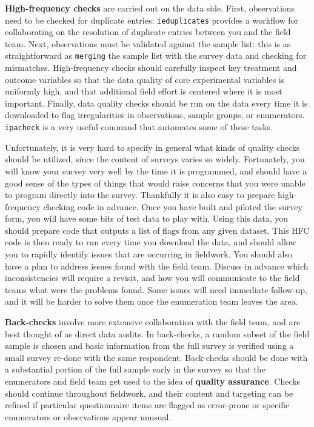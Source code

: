 \textbf{High-frequency checks} are carried out on the data side.
First, observations need to be checked for duplicate entries:
\texttt{ieduplicates}
provides a workflow for collaborating on the resolution of
duplicate entries between you and the field team.
Next, observations must be validated against the sample list:
this is as straightforward as \texttt{merging} the sample list with
the survey data and checking for mismatches.
High-frequency checks should carefully inspect
key treatment and outcome variables
so that the data quality of core experimental variables is uniformly high,
and that additional field effort is centered where it is most important.
Finally, data quality checks
should be run on the data every time it is downloaded
to flag irregularities in observations, sample groups, or enumerators.
\texttt{ipacheck} is a very useful command that automates some of these tasks.

Unfortunately, it is very hard to specify in general
what kinds of quality checks should be utilized,
since the content of surveys varies so widely.
Fortunately, you will know your survey very well
by the time it is programmed, and should have a good sense
of the types of things that would raise concerns
that you were unable to program directly into the survey.
Thankfully it is also easy to prepare high-frequency checking code in advance.
Once you have built and piloted the survey form,
you will have some bits of test data to play with.
Using this data, you should prepare code that outputs
a list of flags from any given dataset.
This HFC code is then ready to run every time you download the data,
and should allow you to rapidly identify issues
that are occurring in fieldwork.
You should also have a plan to address issues found with the field team.
Discuss in advance which inconsistencies will require a revisit,
and how you will communicate to the field teams what were the problems found.
Some issues will need immediate follow-up,
and it will be harder to solve them once the enumeration team leaves the area.

\textbf{Back-checks}
involve more extensive collaboration with the field team,
and are best thought of as direct data audits.
In back-checks, a random subset of the field sample is chosen
and basic information from the full survey is verified
using a small survey re-done with the same respondent.
Back-checks should be done with a substantial portion
of the full sample early in the survey
so that the enumerators and field team
get used to the idea of \textbf{quality assurance}.
Checks should continue throughout fieldwork,
and their content and targeting can be refined if particular
questionnaire items are flagged as error-prone
or specific enumerators or observations appear unusual.

